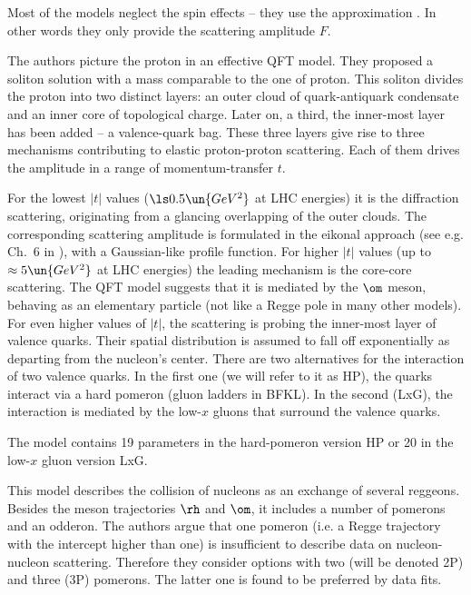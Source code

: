 Most of the models neglect the spin effects -- they use the approximation . In other words they only provide the scattering amplitude $F$.

\def\OutlineLabel{The model of Islam et al.}

The authors picture the proton in an effective QFT model. They proposed a soliton solution with a mass comparable to the one of proton. This soliton divides the proton into two distinct layers: an outer cloud of quark-antiquark condensate and an inner core of topological charge. Later on, a third, the inner-most layer has been added -- a valence-quark bag. These three layers give rise to three mechanisms contributing to elastic proton-proton scattering. Each of them drives the amplitude in a range of momentum-transfer $t$.

For the lowest $|t|$ values ($\ls 0.5\un{GeV^2}$ at LHC energies) it is the diffraction scattering, originating from a glancing overlapping of the outer clouds. The corresponding scattering amplitude is formulated in the eikonal approach (see e.g. Ch.~6 in ), with a Gaussian-like profile function. For higher $|t|$ values (up to $\approx 5\un{GeV^2}$ at LHC energies) the leading mechanism is the core-core scattering. The QFT model suggests that it is mediated by the $\rm\om$ meson, behaving as an elementary particle (not like a Regge pole in many other models). For even higher values of $|t|$, the scattering is probing the inner-most layer of valence quarks. Their spatial distribution is assumed to fall off exponentially as departing from the nucleon's center. There are two alternatives for the interaction of two valence quarks. In the first one (we will refer to it as HP), the quarks interact via a hard pomeron (gluon ladders in BFKL). In the second (LxG), the interaction is mediated by the low-$x$ gluons that surround the valence quarks.

The model contains 19 parameters in the hard-pomeron version HP or 20 in the low-$x$ gluon version LxG.

\def\OutlineLabel{The model of Petrov et al.}

This model describes the collision of nucleons as an exchange of several reggeons. Besides the meson trajectories $\rm\rh$ and $\rm\om$, it includes a number of pomerons and an odderon. The authors argue that one pomeron (i.e. a Regge trajectory with the intercept higher than one) is insufficient to describe data on nucleon-nucleon scattering. Therefore they consider options with two (will be denoted 2P) and three (3P) pomerons. The latter one is found to be preferred by data fits.

